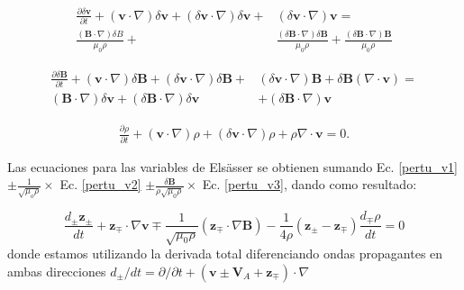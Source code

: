 \documentclass[a4paper,11pt]{report}
\begin{document}
\begin{equation}
\begin{split} 
\frac{\partial \delta \boldsymbol{v}}{\partial t} +(\boldsymbol{v}\cdot \nabla)\delta\boldsymbol{v}  +(\delta \boldsymbol{v} \cdot \nabla)\delta\boldsymbol{v}+&(\delta\boldsymbol{v}\cdot \nabla)\boldsymbol{v}= \\
\frac{(\boldsymbol{B}\cdot \nabla )\delta B}{\mu_0 \rho}+&\frac{(\delta\boldsymbol{B} \cdot \nabla)\delta \boldsymbol{B}}{\mu_0 \rho}+\frac{(\delta\boldsymbol{B}\cdot \nabla)\boldsymbol{B}}{\mu_0 \rho} \label{pertu_v1}
\end{split}
\end{equation}


\begin{equation}
\begin{split} 
\frac{\partial \delta \boldsymbol{B}}{\partial t} +(\boldsymbol{v}\cdot \nabla)\delta\boldsymbol{B}  +(\delta \boldsymbol{v} \cdot \nabla)\delta\boldsymbol{B}+&(\delta\boldsymbol{v}\cdot \nabla)\boldsymbol{B} + \delta \boldsymbol{B}(\nabla \cdot \boldsymbol{v})= \\
(\boldsymbol{B}\cdot \nabla)\delta\boldsymbol{v}  +(\delta \boldsymbol{B} \cdot \nabla)\delta\boldsymbol{v}&+(\delta\boldsymbol{B}\cdot \nabla)\boldsymbol{v} \label{pertu_v2}
\end{split}
\end{equation}

\begin{eqnarray}
  \frac{\partial \rho}{\partial t}+(\boldsymbol{v}\cdot \nabla)\rho+(\delta \boldsymbol{v}\cdot \nabla) \rho + \rho\nabla \cdot \boldsymbol{v} = 0. \label{pertu_v3}
\end{eqnarray}

Las ecuaciones para las variables de Elsässer se obtienen sumando Ec. \ref{pertu_v1} $\pm \frac{1}{\sqrt{\mu_o \rho}}\times$ Ec. \ref{pertu_v2} $\pm \frac{\delta \boldsymbol{B}}{\rho \sqrt{\mu_0 \rho}}\times$ Ec. \ref{pertu_v3}, dando como resultado:

\begin{equation}
  \frac{d_\pm \boldsymbol{z}_\pm}{dt}+ \boldsymbol{z}_\mp \cdot \nabla \boldsymbol{v} \mp \frac{1}{\sqrt{\mu_0 \rho}}(\boldsymbol{z}_\mp \cdot \nabla \boldsymbol{B}) - \frac{1}{4\rho}(\boldsymbol{z}_\pm - \boldsymbol{z}_\mp) \frac{d_\mp \rho}{dt}=0 \label{bardo}
\end{equation}
donde estamos utilizando la derivada total diferenciando ondas propagantes en ambas direcciones $d_\pm/dt = \partial/\partial t+ (\boldsymbol{v}\pm \boldsymbol{V}_A+\boldsymbol{z}_\mp)\cdot \nabla$
\end{document}
